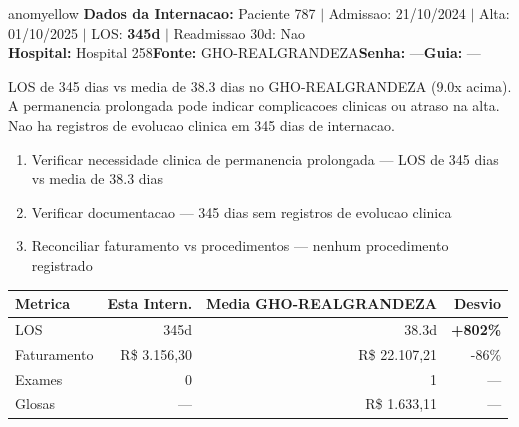 \documentclass[a4paper,10pt]{article}
\begin{document}
\newpage

\begin{anomalycard}[Internacao 9522 | GHO-REALGRANDEZA | MODERADO (z=2.21)]{anomyellow}
\textbf{Dados da Internacao:} Paciente 787 $\mid$ Admissao: 21/10/2024 $\mid$ Alta: 01/10/2025 $\mid$ LOS: \textbf{345d} $\mid$ Readmissao 30d: Nao\\
\textbf{Hospital:} Hospital 258\quad\textbf{Fonte:} GHO-REALGRANDEZA\quad\textbf{Senha:} ---\quad\textbf{Guia:} ---\\
\vspace{2pt}\begin{tcolorbox}[colback=severityred!20,colframe=anomyellow,title={\textbf{Interpretacao de Negocio}},fonttitle=\bfseries\small,left=4pt,right=4pt,top=3pt,bottom=3pt]
{\small LOS de 345 dias vs media de 38.3 dias no GHO-REALGRANDEZA (9.0x acima). A permanencia prolongada pode indicar complicacoes clinicas ou atraso na alta. Nao ha registros de evolucao clinica em 345 dias de internacao.}
\end{tcolorbox}
\begin{tcolorbox}[colback=severityyellow!30,colframe=anomorange,title={\textbf{Recomendacoes Especificas}},fonttitle=\bfseries\small,left=4pt,right=4pt,top=3pt,bottom=3pt]
\begin{enumerate}[nosep,leftmargin=16pt]
\item {\small Verificar necessidade clinica de permanencia prolongada --- LOS de 345 dias vs media de 38.3 dias}
\item {\small Verificar documentacao --- 345 dias sem registros de evolucao clinica}
\item {\small Reconciliar faturamento vs procedimentos --- nenhum procedimento registrado}
\end{enumerate}
\end{tcolorbox}
\begin{center}\begin{tabular}{l r r r}\toprule\textbf{Metrica} & \textbf{Esta Intern.} & \textbf{Media GHO-REALGRANDEZA} & \textbf{Desvio} \\\midrule
LOS & 345d & 38.3d & \textcolor{anomred}{\textbf{+802\%}} \\
Faturamento & R\$ 3.156,30 & R\$ 22.107,21 & -86\% \\
Exames & 0 & 1 & --- \\
Glosas & --- & R\$ 1.633,11 & --- \\
\bottomrule\end{tabular}\end{center}


\end{anomalycard}
\end{document}
